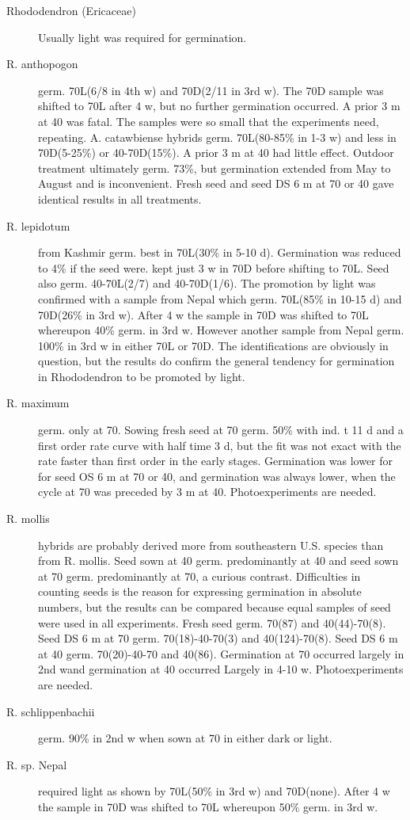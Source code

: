 \begin{description}
\item[Rhododendron (Ericaceae)] Usually light was required for germination.
\item[R. anthopogon] germ. 70L(6/8 in 4th w) and 70D(2/11 in 3rd w). The 70D
sample was shifted to 70L after 4 w, but no further germination occurred. A prior 3 m at
40 was fatal. The samples were so small that the experiments need, repeating.
A. catawbiense hybrids germ. 70L(80-85\% in 1-3 w) and less in 70D(5-25\%) or
40-70D(15\%). A prior 3 m at 40 had little effect. Outdoor treatment ultimately germ.
73\%, but germination extended from May to August and is inconvenient. Fresh seed
and seed DS 6 m at 70 or 40 gave identical results in all treatments.
\item[R. lepidotum] from Kashmir germ. best in 70L(30\% in 5-10 d). Germination was
reduced to 4\% if the seed were. kept just 3 w in 70D before shifting to 70L. Seed also
germ. 40-70L(2/7) and 40-70D(1/6). The promotion by light was confirmed with a
sample from Nepal which germ. 70L(85\% in 10-15 d) and 70D(26\% in 3rd w). After 4
w the sample in 70D was shifted to 70L whereupon 40\% germ. in 3rd w. However
another sample from Nepal germ. 100\% in 3rd w in either 70L or 70D. The
identifications are obviously in question, but the results do confirm the general
tendency for germination in Rhododendron to be promoted by light.
\item[R. maximum] germ. only at 70. Sowing fresh seed at 70 germ. 50\% with ind. t 11
d and a first order rate curve with half time 3 d, but the fit was not exact with the rate
faster than first order in the early stages. Germination was lower for for seed OS 6 m at
70 or 40, and germination was always lower, when the cycle at 70 was preceded by 3
m at 40. Photoexperiments are needed.
\item[R. mollis] hybrids are probably derived more from southeastern U.S. species
than from R. mollis. Seed sown at 40 germ. predominantly at 40 and seed sown at 70
germ. predominantly at 70, a curious contrast. Difficulties in counting seeds is the
reason for expressing germination in absolute numbers, but the results can be
compared because equal samples of seed were used in all experiments. Fresh seed
germ. 70(87) and 40(44)-70(8). Seed DS 6 m at 70 germ. 70(18)-40-70(3) and
40(124)-70(8). Seed DS 6 m at 40 germ. 70(20)-40-70 and 40(86). Germination at 70
occurred largely in 2nd wand germination at 40 occurred Largely in 4-10 w.
Photoexperiments are needed.
\item[R. schlippenbachii] germ. 90\% in 2nd w when sown at 70 in either dark or light.
\item[R. sp. Nepal] required light as shown by 70L(50\% in 3rd w) and 70D(none).
After 4 w the sample in 70D was shifted to 70L whereupon 50\% germ. in 3rd w.


\end{description}
